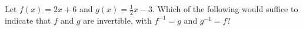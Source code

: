 \documentclass{ximera}
\author{Gregory Hartman \and Matthew Carr}
\begin{document}
\begin{exercise}



Let $f(x)=2x+6$ and $g(x)=\frac{1}{2}x-3$. Which of the following would suffice to indicate that $f$ and $g$ are invertible, with $f^{-1}=g$ and $g^{-1}=f$?

\begin{prompt}
\begin{multipleChoice}
\end{multipleChoice}
\end{prompt}


\end{exercise}
\end{document}
